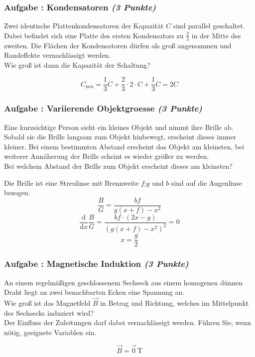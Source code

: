 \documentclass[12pt,a4paper]{article}
\newcommand{\unit}[1]{\,\mathrm{#1}}
\newcommand{\dif}{\mathrm{d}}
\newcommand{\tdif}[2]{\frac{\dif#1}{\dif#2}}
\newcounter{numlabel}
\newenvironment{problem}[2]{\stepcounter{numlabel} \vspace{1ex} \subsubsection*{Aufgabe \the\value{numlabel}: #1 \emph{(#2 Punkte)}} \renewcommand{\Currentlabel}{Aufgabe \the\value{numlabel}: #1}}{

}
\begin{document}

\begin{problem}{Kondensatoren}{3}
Zwei identische Plattenkondensatoren der Kapazität $C$ sind parallel geschaltet. Dabei befindet sich eine Platte des ersten Kondensators zu $\frac{2}{3}$ in der Mitte des zweiten. Die Flächen der Kondensatoren dürfen als groß angenommen und Randeffekte vernachlässigt werden.\\
Wie groß ist dann die Kapazität der Schaltung?
\begin{solution}
\[
C_\mathrm{neu}=\frac{1}{3}C+\frac{2}{3}\cdot 2\cdot C+\frac{1}{3}C=2C
\]
\end{solution}
\end{problem}


\begin{problem}{Variierende Objektgroesse}{3}
Eine kurzsichtige Person sieht ein kleines Objekt und nimmt ihre Brille ab. Sobald sie die Brille langsam zum Objekt hinbewegt, erscheint dieses immer kleiner. Bei einem bestimmten Abstand erscheint das Objekt am kleinsten, bei weiterer Annäherung der Brille scheint es wieder größer zu werden.\\
Bei welchem Abstand der Brille zum Objekt erscheint dieses am kleinsten?
\begin{solution}
Die Brille ist eine Streulinse mit Brennweite $f$;\qquad $g$ und $b$ sind auf die Augenlinse bezogen.
\[
\frac{B}{G}=\frac{b f}{g(x+f)-x^2}
\]
\[
\tdif{}{x}\frac{B}{G}=\frac{b f\cdot (2x-g)}{(g(x+f)-x^2)^2}=0
\]
\[
x=\frac{g}{2}
\]
\end{solution}
\end{problem}


\begin{problem}{Magnetische Induktion}{3}
An einem regelmäßigen geschlossenem Sechseck aus einem homogenen dünnen Draht liegt an zwei benachbarten Ecken eine Spannung an.\\
Wie groß ist das Magnetfeld $\vec{B}$ in Betrag und Richtung, welches im Mittelpunkt des Sechsecks induziert wird?\\
Der Einfluss der Zuleitungen darf dabei vernachlässigt werden. Führen Sie, wenn nötig, geeignete Variablen ein.
\begin{solution}
\[
\vec{B}=\vec{0}\unit{T}
\]
\end{solution}
\end{problem}
\end{document}
